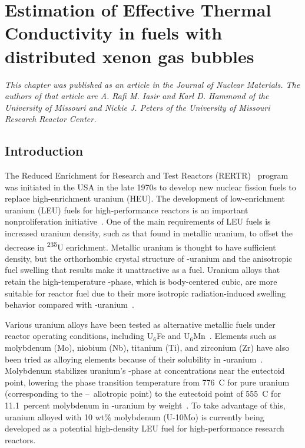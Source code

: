 \chapter{Estimation of Effective Thermal Conductivity in \protect{} fuels with distributed xenon gas bubbles}
\textit{This chapter was published as an article in the \textup{Journal of Nuclear Materials}. The authors of that article are A. Rafi M. Iasir and Karl D. Hammond of the University of Missouri and Nickie J. Peters of the University of Missouri Research Reactor Center.}

\section{Introduction}\label{sec:introduction}
The Reduced Enrichment for Research and Test Reactors (RERTR)~\cite{snelgrove1997development} program was initiated in the USA in the late 1970s to develop new nuclear fission fuels to replace high-enrichment uranium (HEU)\@. The development of low-enrichment uranium (LEU) fuels for high-performance reactors is an important nonproliferation initiative~\cite{snelgrove1997development}. One of the main requirements of LEU fuels is increased uranium density, such as that found in metallic uranium, to offset the decrease in \textsuperscript{235}U enrichment. Metallic uranium is thought to have sufficient density, but the orthorhombic crystal structure of \textalpha-uranium
and the anisotropic fuel swelling that results make it unattractive as a fuel.
Uranium alloys that retain the high-temperature \textgamma-phase, which is body-centered cubic, are more suitable for reactor fuel due to their more isotropic radiation-induced swelling behavior compared with  \textalpha-uranium~\cite{kittel1993history}.

Various uranium alloys have been tested as alternative metallic fuels under reactor operating conditions, including U$_6$Fe and U$_6$Mn~\cite{meyer2000irradiation,hofman1987irradiation}.
Elements such as molybdenum (Mo), niobium (Nb), titanium (Ti), and zirconium (Zr) have also been tried as alloying elements because of their solubility in \textgamma-uranium~\cite{donze1959stabilisation,giraud1973formation,lopes2013mechanical}. Molybdenum stabilizes uranium's \textgamma-phase at concentrations near the eutectoid point, lowering the phase transition temperature from 776~\textdegree C for pure uranium (corresponding to the \textbeta--\textgamma\ allotropic point) to the eutectoid point of 555~\textdegree C for 11.1~percent molybdenum in \textgamma-uranium by weight~\cite{ASM-Alloy-Mo,Berche2011}. To take advantage of this, uranium alloyed with 10 wt$\%$ molybdenum (U-10Mo) is currently being developed as a potential high-density LEU fuel for high-performance research reactors.

